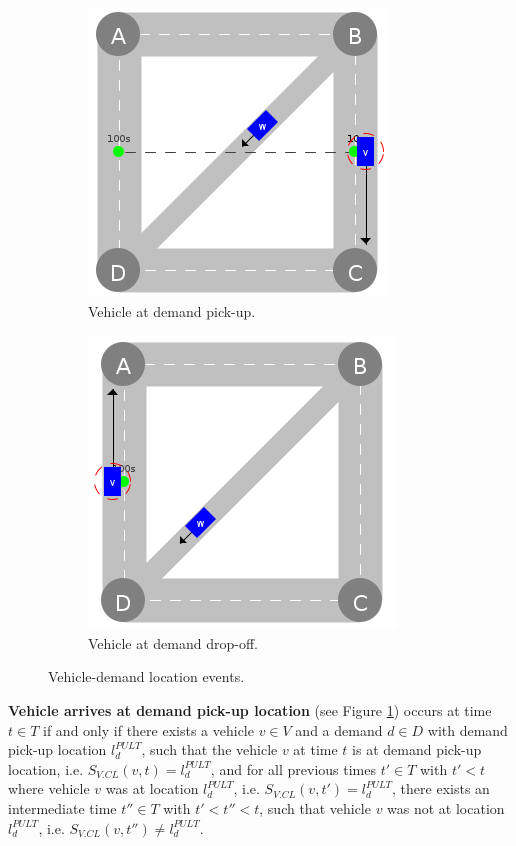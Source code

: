 \documentclass[graybox]{svmult}
\begin{document}
\begin{figure}[htbp]
    \centering
	\begin{subfigure}{.45\textwidth}
		\centering
		\includegraphics[scale=0.35]{../../events/vehicle-at-demand-pick-up.png}
		\caption{Vehicle at demand pick-up.}
		\label{fig:vehicle-at-demand-pick-up}
	\end{subfigure}
	\begin{subfigure}{.45\textwidth}
		\centering
		\includegraphics[scale=0.35]{../../events/vehicle-at-demand-drop-off.png}
		\caption{Vehicle at demand drop-off.}
		\label{fig:vehicle-at-demand-drop-off}
	\end{subfigure}
	\caption{Vehicle-demand location events.}
	\label{fig:demand-events}	
\end{figure}

\noindent \textbf{Vehicle arrives at demand pick-up location} (see Figure \ref{fig:vehicle-at-demand-pick-up}) occurs at time $t \in T$ if and only if there exists a vehicle $v \in V$ and a demand $d \in D$ with demand pick-up location $l_d^{PULT}$, such that the vehicle $v$ at time $t$ is at demand pick-up location, i.e. $S_{V.CL}(v, t) = l_d^{PULT}$, and for all previous times $t' \in T$ with $t' < t$ where vehicle $v$ was at location $l_d^{PULT}$, i.e. $S_{V.CL}(v, t') = l_d^{PULT}$, there exists an intermediate time $t'' \in T$ with $t' < t'' < t$, such that vehicle $v$ was not at location $l_d^{PULT}$, i.e. $S_{V.CL}(v, t'') \neq l_d^{PULT}$.
\end{document}
